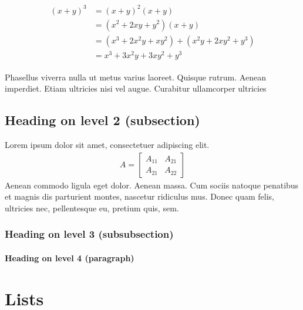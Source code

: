 \documentclass[paper=a4, fontsize=12pt]{scrartcl}
\numberwithin{equation}{section} %
\numberwithin{figure}{section} %
\numberwithin{table}{section} %
\begin{document}
\begin{align} 
\begin{split}
(x+y)^3 	&= (x+y)^2(x+y)\\
&=(x^2+2xy+y^2)(x+y)\\
&=(x^3+2x^2y+xy^2) + (x^2y+2xy^2+y^3)\\
&=x^3+3x^2y+3xy^2+y^3
\end{split}					
\end{align}

Phasellus viverra nulla ut metus varius laoreet. Quisque rutrum. Aenean imperdiet. Etiam ultricies nisi vel augue. Curabitur ullamcorper ultricies


\subsection{Heading on level 2 (subsection)}

Lorem ipsum dolor sit amet, consectetuer adipiscing elit. 
\begin{align}
A = 
\begin{bmatrix}
A_{11} & A_{21} \\
A_{21} & A_{22}
\end{bmatrix}
\end{align}
Aenean commodo ligula eget dolor. Aenean massa. Cum sociis natoque penatibus et magnis dis parturient montes, nascetur ridiculus mus. Donec quam felis, ultricies nec, pellentesque eu, pretium quis, sem.


\subsubsection{Heading on level 3 (subsubsection)}

\lipsum[3] %

\paragraph{Heading on level 4 (paragraph)}

\lipsum[6] %


\section{Lists}
\end{document}
